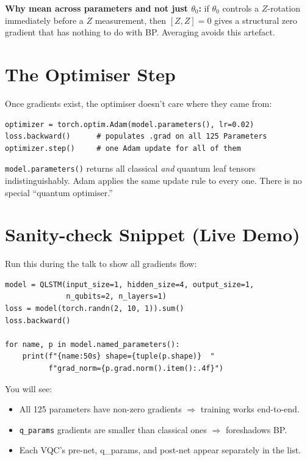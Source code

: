 \documentclass[11pt,a4paper]{article}
\begin{document}
\textbf{Why mean across parameters and not just $\theta_0$:} if $\theta_0$ controls a $Z$-rotation immediately before a $Z$ measurement, then $[Z, Z] = 0$ gives a structural zero gradient that has nothing to do with BP. Averaging avoids this artefact.

\section{The Optimiser Step}

Once gradients exist, the optimiser doesn't care where they came from:
\begin{lstlisting}
optimizer = torch.optim.Adam(model.parameters(), lr=0.02)
loss.backward()      # populates .grad on all 125 Parameters
optimizer.step()     # one Adam update for all of them
\end{lstlisting}

\texttt{model.parameters()} returns all classical \emph{and} quantum leaf tensors indistinguishably. Adam applies the same update rule to every one. There is no special ``quantum optimiser.''

\section{Sanity-check Snippet (Live Demo)}

Run this during the talk to show all gradients flow:

\begin{lstlisting}
model = QLSTM(input_size=1, hidden_size=4, output_size=1,
              n_qubits=2, n_layers=1)
loss = model(torch.randn(2, 10, 1)).sum()
loss.backward()

for name, p in model.named_parameters():
    print(f"{name:50s} shape={tuple(p.shape)}  "
          f"grad_norm={p.grad.norm().item():.4f}")
\end{lstlisting}

You will see:
\begin{itemize}
  \item All 125 parameters have non-zero gradients $\Rightarrow$ training works end-to-end.
  \item \texttt{q\_params} gradients are smaller than classical ones $\Rightarrow$ foreshadows BP.
  \item Each VQC's pre-net, q\_params, and post-net appear separately in the list.
\end{itemize}
\end{document}

